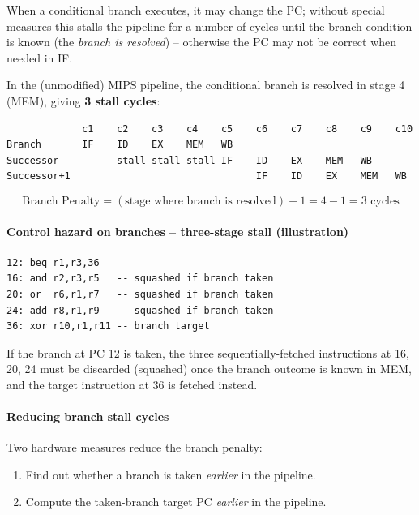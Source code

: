 \begin{definition}
When a conditional branch executes, it may change the PC; without special
measures this stalls the pipeline for a number of cycles until the branch
condition is known (the \emph{branch is resolved}) -- otherwise the PC may
not be correct when needed in IF.
\end{definition}

In the (unmodified) MIPS pipeline, the conditional branch is resolved in
stage 4 (MEM), giving \textbf{3 stall cycles}:

\begin{lstlisting}
             c1    c2    c3    c4    c5    c6    c7    c8    c9    c10
Branch       IF    ID    EX    MEM   WB
Successor          stall stall stall IF    ID    EX    MEM   WB
Successor+1                                IF    ID    EX    MEM   WB
\end{lstlisting}
\begin{prop}
\[
  \text{Branch Penalty} = (\text{stage where branch is resolved}) - 1 = 4-1 = 3 \text{ cycles}
\]
\end{prop}

\paragraph{Control hazard on branches -- three-stage stall (illustration)}

\begin{lstlisting}
12: beq r1,r3,36
16: and r2,r3,r5   -- squashed if branch taken
20: or  r6,r1,r7   -- squashed if branch taken
24: add r8,r1,r9   -- squashed if branch taken
36: xor r10,r1,r11 -- branch target
\end{lstlisting}
If the branch at PC 12 is taken, the three sequentially-fetched instructions
at 16, 20, 24 must be discarded (squashed) once the branch outcome is known
in MEM, and the target instruction at 36 is fetched instead.

\paragraph{Reducing branch stall cycles}

Two hardware measures reduce the branch penalty:
\begin{enumerate}
  \item Find out whether a branch is taken \emph{earlier} in the pipeline.
  \item Compute the taken-branch target PC \emph{earlier} in the pipeline.
\end{enumerate}

